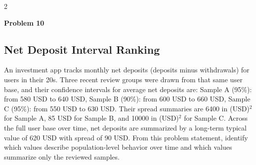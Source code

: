 \documentclass[12pt]{article}
\newcommand{\SubsectionBox}[1]{%
\noindent\colorbox{gray!30}{\parbox{\linewidth}{\textbf{#1}}}\par\vspace{0.35cm}%
}
\begin{document}
\begin{multicols}{2}
\vspace{0.5cm}
\SubsectionBox{Problem 10}
\subsection*{Net Deposit Interval Ranking}
An investment app tracks monthly net deposits (deposits minus withdrawals) for users in their 20s.
		Three recent review groups were drawn from that same user base, and their confidence intervals for average net deposits are:
		Sample A (95\%): from 580 USD to 640 USD,
		Sample B (90\%): from 600 USD to 660 USD,
		Sample C (95\%): from 550 USD to 630 USD.
		Their spread summaries are 6400 in (USD)$^2$ for Sample A, 85 USD for Sample B, and 10000 in (USD)$^2$ for Sample C.
		Across the full user base over time, net deposits are summarized by a long-term typical value of 620 USD with spread of 90 USD.
		From this problem statement, identify which values describe population-level behavior over time and which values summarize only the reviewed samples.

\end{multicols}
\end{document}
